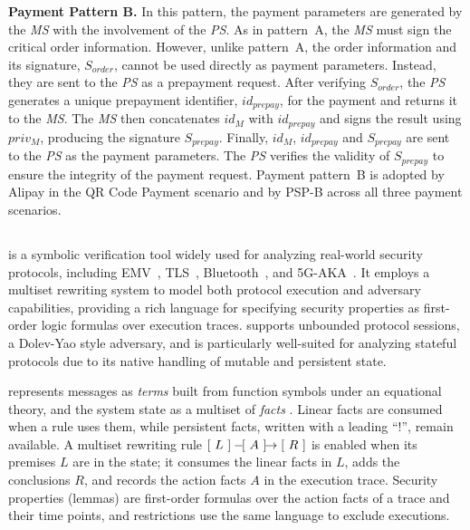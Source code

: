 \textbf{Payment Pattern B.}
In this pattern, the payment parameters are generated by the \emph{MS} with the involvement of the \emph{PS}.
As in pattern~A, the \emph{MS} must sign the critical order information.
However, unlike pattern~A, the order information and its signature, $S_{order}$, cannot be used directly as payment parameters.
Instead, they are sent to the \emph{PS} as a prepayment request.
After verifying $S_{order}$, the \emph{PS} generates a unique prepayment identifier, $id_{prepay}$, for the payment and returns it to the \emph{MS}.
The \emph{MS} then concatenates $id_{M}$ with $id_{prepay}$ and signs the result using $priv_{M}$, producing the signature $S_{prepay}$.
Finally, $id_{M}$, $id_{prepay}$ and $S_{prepay}$ are sent to the \emph{PS} as the payment parameters.
The \emph{PS} verifies the validity of $S_{prepay}$ to ensure the integrity of the payment request.
Payment pattern~B is adopted by Alipay in the QR Code Payment scenario and by PSP-B across all three payment scenarios.


\subsection{\Tamarin}

\Tamarin is a symbolic verification tool widely used for analyzing real-world security protocols, including 
EMV~\cite{Radu2022EMVRelayProtection,Basin2021EMVStandard,Basin2021CardBrandMixup}, 
TLS~\cite{Cremers2016AutomatedTLS,Cremers2017ComprehensiveTLS,Lee2019maTLS}, 
Bluetooth~\cite{Shi2023FormalBLEPairing,Jangid2023ExtrapolatingBluetoothPasskey}, 
and 5G-AKA~\cite{basin2018formal,cremers2019component}.
It employs a multiset rewriting system to model both protocol execution and adversary capabilities, providing a rich language for specifying security properties as first-order logic formulas over execution traces. 
\Tamarin supports unbounded protocol sessions, a Dolev-Yao style adversary, and is particularly well-suited for analyzing stateful protocols due to its native handling of mutable and persistent state.

\Tamarin represents messages as \emph{terms} built from function symbols under an equational theory, and the system state as a multiset of \emph{facts} .
Linear facts are consumed when a rule uses them, while persistent facts, written with a leading ``!'', remain available.
A multiset rewriting rule $\lbrack\ L \ \rbrack - \hspace{-3.7pt} \lbrack\ A \ \rbrack \hspace{-4.2pt} \rightarrow \lbrack\ R \ \rbrack$ is enabled when its premises $L$ are in the state; it consumes the linear facts in $L$, adds the conclusions $R$, and records the action facts $A$ in the execution trace.
Security properties (lemmas) are first-order formulas over the action facts of a trace and their time points, and restrictions use the same language to exclude executions.
